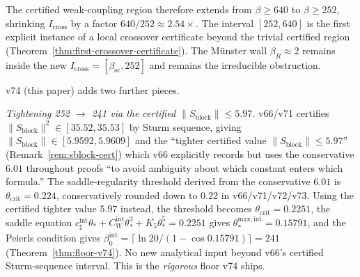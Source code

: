 \documentclass[11pt]{article}
\theoremstyle{definition}
\newcommand{\betasc}{\beta_{\mathrm{sc}}}
\begin{document}
The certified weak-coupling region therefore extends from $\beta\ge 640$
to $\beta\ge 252$, shrinking $I_{\mathrm{cross}}$ by a factor
$640/252\approx 2.54\times$.  The interval $[252,640]$ is the
first explicit instance of a local crossover certificate beyond the
trivial certified region \textup{(}Theorem~\ref{thm:first-crossover-certificate}\textup{)}.
The M\"unster wall $\beta_R\approx 2$ remains inside the new
$I_{\mathrm{cross}}=[\betasc,252]$ and remains the irreducible
obstruction.

v74 \textup{(}this paper\textup{)} adds two further pieces.

\emph{Tightening 252 $\to$ 241 via the certified $\|S_{\mathrm{block}}\|\le 5.97$.}
v66/v71 certifies $\|S_{\mathrm{block}}\|^2\in[35.52,35.53]$ by Sturm
sequence, giving $\|S_{\mathrm{block}}\|\in[5.9592,5.9609]$ and the
``tighter certified value $\|S_{\mathrm{block}}\|\le 5.97$''
\textup{(}Remark~\ref{rem:sblock-cert}\textup{)} which v66 explicitly
records but uses the conservative $6.01$ throughout proofs ``to avoid
ambiguity about which constant enters which formula.''  The
saddle-regularity threshold derived from the conservative $6.01$ is
$\theta_{\mathrm{crit}}=0.224$, conservatively rounded down to $0.22$
in v66/v71/v72/v73.  Using the certified tighter value $5.97$ instead,
the threshold becomes $\theta_{\mathrm{crit}}=0.2251$, the saddle
equation $c_\sharp^{\mathrm{int}}\theta_*+C_W^{\mathrm{int}}\theta_*^3+K_5\theta_*^5=0.2251$
gives $\theta_*^{\mathrm{max,int}}=0.15791$, and the Peierls
condition gives $\beta_0^{\mathrm{int}}=\lceil\ln 20/(1-\cos 0.15791)\rceil=241$
\textup{(}Theorem~\ref{thm:floor-v74}\textup{)}.  No new analytical
input beyond v66's certified Sturm-sequence interval.  This is the
\emph{rigorous} floor v74 ships.
\end{document}
